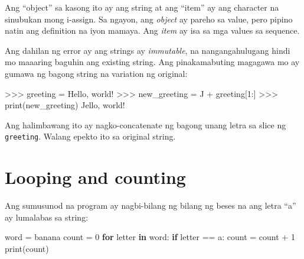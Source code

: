 \documentclass[10pt,]{book}
\newenvironment{Shaded}{}{}
\newcommand{\BuiltInTok}[1]{\textcolor[rgb]{0.00,0.50,0.00}{#1}}
\newcommand{\ControlFlowTok}[1]{\textcolor[rgb]{0.00,0.44,0.13}{\textbf{#1}}}
\newcommand{\DecValTok}[1]{\textcolor[rgb]{0.25,0.63,0.44}{#1}}
\newcommand{\KeywordTok}[1]{\textcolor[rgb]{0.00,0.44,0.13}{\textbf{#1}}}
\newcommand{\NormalTok}[1]{#1}
\newcommand{\OperatorTok}[1]{\textcolor[rgb]{0.40,0.40,0.40}{#1}}
\newcommand{\StringTok}[1]{\textcolor[rgb]{0.25,0.44,0.63}{#1}}
\begin{document}
Ang ``object'' sa kasong ito ay ang string at ang ``item'' ay ang
character na sinubukan mong i-assign. Sa ngayon, ang \emph{object} ay
pareho sa value, pero pipino natin ang definition na iyon mamaya. Ang
\emph{item} ay isa sa mga values sa sequence.

  

Ang dahilan ng error ay ang strings ay \emph{immutable}, na
nangangahulugang hindi mo maaaring baguhin ang existing string. Ang
pinakamabuting magagawa mo ay gumawa ng bagong string na variation ng
original:

\begin{Shaded}
\begin{Highlighting}[]
\OperatorTok{\textgreater{}\textgreater{}\textgreater{}}\NormalTok{ greeting }\OperatorTok{=} \StringTok{\textquotesingle{}Hello, world!\textquotesingle{}}
\OperatorTok{\textgreater{}\textgreater{}\textgreater{}}\NormalTok{ new\_greeting }\OperatorTok{=} \StringTok{\textquotesingle{}J\textquotesingle{}} \OperatorTok{+}\NormalTok{ greeting[}\DecValTok{1}\NormalTok{:]}
\OperatorTok{\textgreater{}\textgreater{}\textgreater{}} \BuiltInTok{print}\NormalTok{(new\_greeting)}
\NormalTok{Jello, world}\OperatorTok{!}
\end{Highlighting}
\end{Shaded}

Ang halimbawang ito ay nagko-concatenate ng bagong unang letra sa slice
ng \texttt{greeting}. Walang epekto ito sa original string.


\section{Looping and counting}\label{looping-and-counting}

 
 

Ang sumusunod na program ay nagbi-bilang ng bilang ng beses na ang letra
``a'' ay lumalabas sa string:

\begin{Shaded}
\begin{Highlighting}[]
\NormalTok{word }\OperatorTok{=} \StringTok{\textquotesingle{}banana\textquotesingle{}}
\NormalTok{count }\OperatorTok{=} \DecValTok{0}
\ControlFlowTok{for}\NormalTok{ letter }\KeywordTok{in}\NormalTok{ word:}
    \ControlFlowTok{if}\NormalTok{ letter }\OperatorTok{==} \StringTok{\textquotesingle{}a\textquotesingle{}}\NormalTok{:}
\NormalTok{        count }\OperatorTok{=}\NormalTok{ count }\OperatorTok{+} \DecValTok{1}
\BuiltInTok{print}\NormalTok{(count)}
\end{Highlighting}
\end{Shaded}
\end{document}
